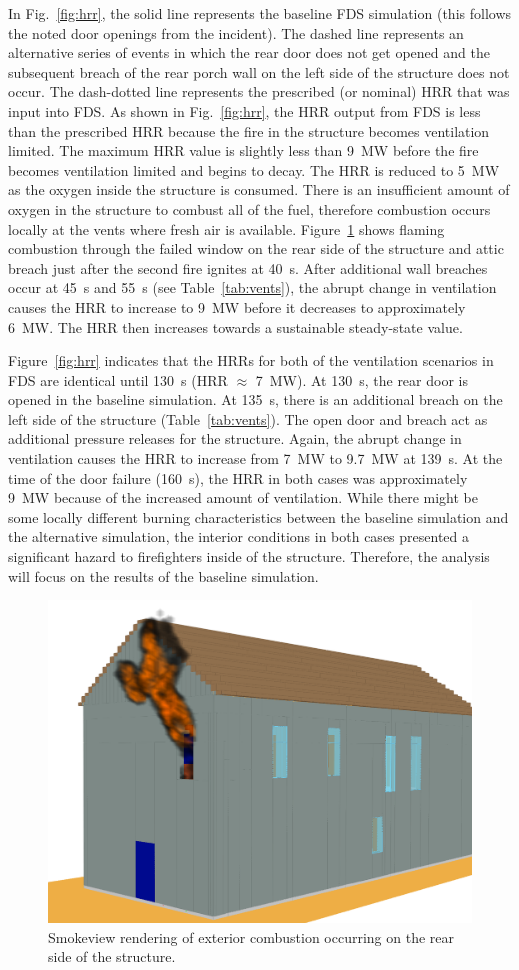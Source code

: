 \documentclass[12pt,oneside]{book}
\begin{document}
In Fig.~\ref{fig:hrr}, the solid line represents the baseline FDS simulation (this follows the noted door openings from the incident). The dashed line represents an alternative series of events in which the rear door does not get opened and the subsequent breach of the rear porch wall on the left side of the structure does not occur. The dash-dotted line represents the prescribed (or nominal) HRR that was input into FDS. As shown in Fig.~\ref{fig:hrr}, the HRR output from FDS is less than the prescribed HRR because the fire in the structure becomes ventilation limited. The maximum HRR value is slightly less than 9~MW before the fire becomes ventilation limited and begins to decay. The HRR is reduced to 5~MW as the oxygen inside the structure is consumed. There is an insufficient amount of oxygen in the structure to combust all of the fuel, therefore combustion occurs locally at the vents where fresh air is available. Figure~\ref{fig:smv_ext_fire} shows flaming combustion through the failed window on the rear side of the structure and attic breach just after the second fire ignites at 40~s. After additional wall breaches occur at 45~s and 55~s (see Table~\ref{tab:vents}), the abrupt change in ventilation causes the HRR to increase to 9~MW before it decreases to approximately 6~MW. The HRR then increases towards a sustainable steady-state value.

Figure~\ref{fig:hrr} indicates that the HRRs for both of the ventilation scenarios in FDS are identical until 130~s (HRR $\approx$ 7~MW). At 130~s, the rear door is opened in the baseline simulation. At 135~s, there is an additional breach on the left side of the structure (Table~\ref{tab:vents}). The open door and breach act as additional pressure releases for the structure. Again, the abrupt change in ventilation causes the HRR to increase from 7~MW to 9.7~MW at 139~s. At the time of the door failure (160~s), the HRR in both cases was approximately 9~MW because of the increased amount of ventilation. While there might be some locally different burning characteristics between the baseline simulation and the alternative simulation, the interior conditions in both cases presented a significant hazard to firefighters inside of the structure. Therefore, the analysis will focus on the results of the baseline simulation.

\begin{figure}[!ht]
\centering
\includegraphics[width=.675\textwidth]{../Figures/smv_exterior_fire}
\caption{Smokeview rendering of exterior combustion occurring on the rear side of the structure.}
\label{fig:smv_ext_fire}
\end{figure}
\end{document}
